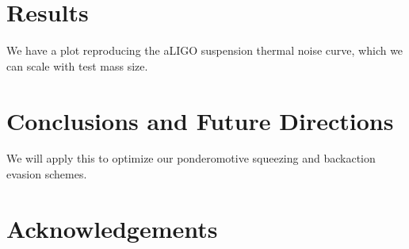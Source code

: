 \documentclass[twocolumn,amsmath,amssymb, resi]{revtex4}
\begin{document}
\section{Results}

We have a plot reproducing the aLIGO suspension thermal noise curve, which we can scale with test mass size.

\section{Conclusions and Future Directions}

We will apply this to optimize our ponderomotive squeezing and backaction evasion schemes.

\section{Acknowledgements}




 
\end{document}
